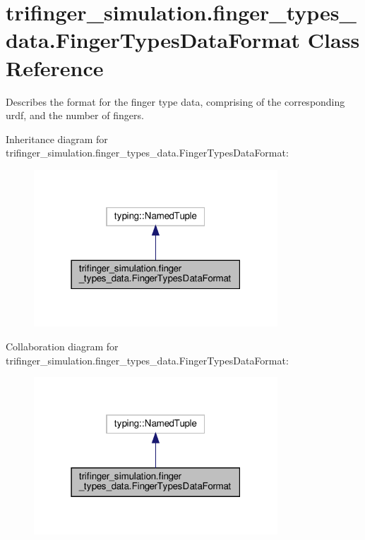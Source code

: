 \hypertarget{classtrifinger__simulation_1_1finger__types__data_1_1FingerTypesDataFormat}{}\section{trifinger\+\_\+simulation.\+finger\+\_\+types\+\_\+data.\+Finger\+Types\+Data\+Format Class Reference}
\label{classtrifinger__simulation_1_1finger__types__data_1_1FingerTypesDataFormat}


Describes the format for the finger type data, comprising of the corresponding urdf, and the number of fingers.  




Inheritance diagram for trifinger\+\_\+simulation.\+finger\+\_\+types\+\_\+data.\+Finger\+Types\+Data\+Format\+:
\nopagebreak
\begin{figure}[H]
\begin{center}
\leavevmode
\includegraphics[width=259pt]{classtrifinger__simulation_1_1finger__types__data_1_1FingerTypesDataFormat__inherit__graph}
\end{center}
\end{figure}


Collaboration diagram for trifinger\+\_\+simulation.\+finger\+\_\+types\+\_\+data.\+Finger\+Types\+Data\+Format\+:
\nopagebreak
\begin{figure}[H]
\begin{center}
\leavevmode
\includegraphics[width=259pt]{classtrifinger__simulation_1_1finger__types__data_1_1FingerTypesDataFormat__coll__graph}
\end{center}
\end{figure}



